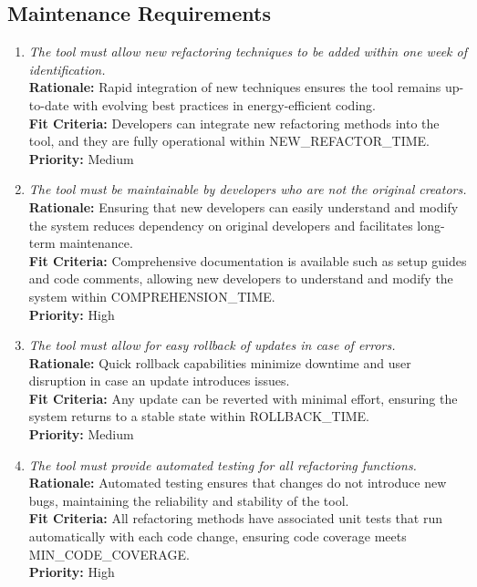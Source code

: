 \documentclass[12pt]{article}
\begin{document}
\subsection{Maintenance Requirements}
\begin{enumerate}[label=MS-MNT \arabic*., wide=0pt, leftmargin=*]
  \item \emph{The tool must allow new refactoring techniques to be
    added within one week of identification.}\\
    {\bf Rationale:} Rapid integration of new techniques ensures the
    tool remains up-to-date with evolving best practices in
    energy-efficient coding.\\
    {\bf Fit Criteria:} Developers can integrate new refactoring
    methods into the tool, and they are fully operational within
    NEW\_REFACTOR\_TIME.\\
    {\bf Priority:} Medium

  \item \emph{The tool must be maintainable by developers who are not
    the original creators.}\\
    {\bf Rationale:} Ensuring that new developers can easily
    understand and modify the system reduces dependency on original
    developers and facilitates long-term maintenance.\\
    {\bf Fit Criteria:} Comprehensive documentation is available such
    as setup guides and code comments, allowing new developers
    to understand and modify the system within COMPREHENSION\_TIME.\\
    {\bf Priority:} High

  \item \emph{The tool must allow for easy rollback of updates in
    case of errors.}\\
    {\bf Rationale:} Quick rollback capabilities minimize downtime
    and user disruption in case an update introduces issues.\\
    {\bf Fit Criteria:} Any update can be reverted with minimal
    effort, ensuring the system returns to a stable state within
    ROLLBACK\_TIME.\\
    {\bf Priority:} Medium

  \item \emph{The tool must provide automated testing for all
    refactoring functions.}\\
    {\bf Rationale:} Automated testing ensures that changes do not
    introduce new bugs, maintaining the reliability and stability of the tool.\\
    {\bf Fit Criteria:} All refactoring methods have associated unit
    tests that run automatically with each code change, ensuring code
    coverage meets MIN\_CODE\_COVERAGE.\\
    {\bf Priority:} High


\end{enumerate}
\end{document}
